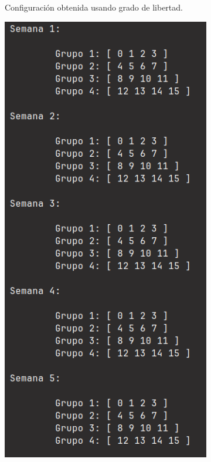 \documentclass[letter, 10pt]{article}
\begin{document}
\begin{figure}[h]
\begin{subfigure}[b]{0.3\textwidth}
        \caption{Configuración obtenida usando grado de libertad.}
        \label{fig:grfree}
    \end{subfigure}
    \hspace{0.5mm}
    \begin{subfigure}[b]{0.3\textwidth}
        \centering
        \includegraphics[width=\textwidth]{figures/greedy_brute.png}

\end{subfigure}
\end{figure}
\end{document}

